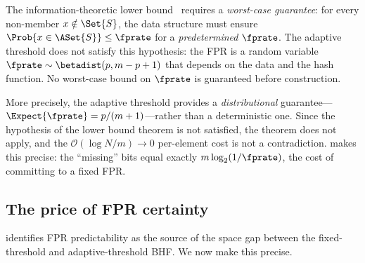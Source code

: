 \begin{remark}
\label{rem:lb_not_violated}
The information-theoretic lower bound~\cite{carter1978} requires a
\emph{worst-case guarantee}: for every non-member $x \notin \Set{S}$, the data
structure must ensure $\Prob{x \in \ASet{S}} \leq \fprate$ for a
\emph{predetermined} $\fprate$.
The adaptive threshold does not satisfy this hypothesis: the FPR is a random
variable $\fprate \sim \betadist(p, m - p + 1)$ that depends on the data and
the hash function.
No worst-case bound on $\fprate$ is guaranteed before construction.

More precisely, the adaptive threshold provides a \emph{distributional}
guarantee---$\Expect{\fprate} = p/(m+1)$---rather than a deterministic one.
Since the hypothesis of the lower bound theorem is not satisfied, the theorem
does not apply, and the $\mathcal{O}(\log N / m) \to 0$ per-element cost is
not a contradiction.
 makes this precise: the ``missing'' bits equal
exactly $m \log_2(1/\fprate)$, the cost of committing to a fixed FPR.
\end{remark}

\subsection{The price of FPR certainty}
\label{sec:price_certainty}

 identifies FPR predictability as the source of
the space gap between the fixed-threshold and adaptive-threshold BHF\@.
We now make this precise.


